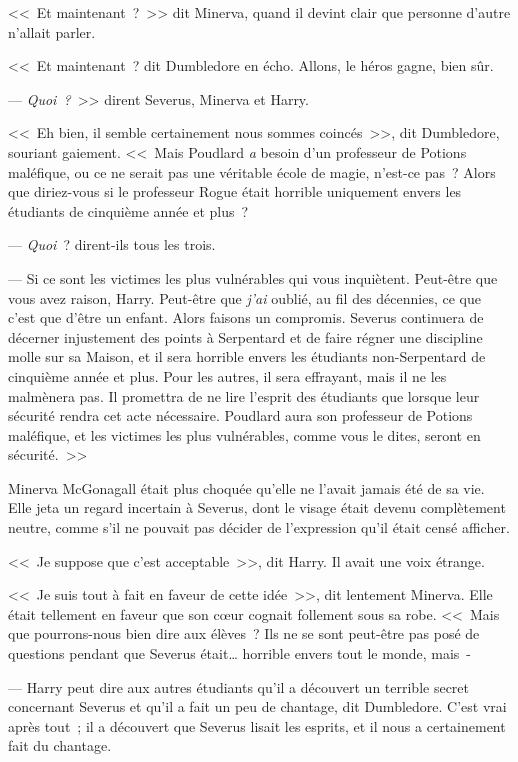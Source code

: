 <<~Et maintenant~?~>> dit Minerva, quand il devint clair que personne d'autre n'allait parler.

<<~Et maintenant~? dit Dumbledore en écho. Allons, le héros gagne, bien sûr.

--- \emph{Quoi~?}~>> dirent Severus, Minerva et Harry.

<<~Eh bien, il semble certainement nous sommes coincés~>>, dit Dumbledore, souriant gaiement. <<~Mais Poudlard \emph{a} besoin d'un professeur de Potions maléfique, ou ce ne serait pas une véritable école de magie, n'est-ce pas~? Alors que diriez-vous si le professeur Rogue était horrible uniquement envers les étudiants de cinquième année et plus~?

--- \emph{Quoi}~? dirent-ils tous les trois.

--- Si ce sont les victimes les plus vulnérables qui vous inquiètent. Peut-être que vous avez raison, Harry. Peut-être que \emph{j'ai} oublié, au fil des décennies, ce que c'est que d'être un enfant. Alors faisons un compromis. Severus continuera de décerner injustement des points à Serpentard et de faire régner une discipline molle sur sa Maison, et il sera horrible envers les étudiants non-Serpentard de cinquième année et plus. Pour les autres, il sera effrayant, mais il ne les malmènera pas. Il promettra de ne lire l'esprit des étudiants que lorsque leur sécurité rendra cet acte nécessaire. Poudlard aura son professeur de Potions maléfique, et les victimes les plus vulnérables, comme vous le dites, seront en sécurité.~>>

Minerva McGonagall était plus choquée qu'elle ne l'avait jamais été de sa vie. Elle jeta un regard incertain à Severus, dont le visage était devenu complètement neutre, comme s'il ne pouvait pas décider de l'expression qu'il était censé afficher.

<<~Je suppose que c'est acceptable~>>, dit Harry. Il avait une voix étrange.

<<~Je suis tout à fait en faveur de cette idée~>>, dit lentement Minerva. Elle était tellement en faveur que son cœur cognait follement sous sa robe. <<~Mais que pourrons-nous bien dire aux élèves~? Ils ne se sont peut-être pas posé de questions pendant que Severus était… horrible envers tout le monde, mais~-

--- Harry peut dire aux autres étudiants qu'il a découvert un terrible secret concernant Severus et qu'il a fait un peu de chantage, dit Dumbledore. C'est vrai après tout~; il a découvert que Severus lisait les esprits, et il nous a certainement fait du chantage.

